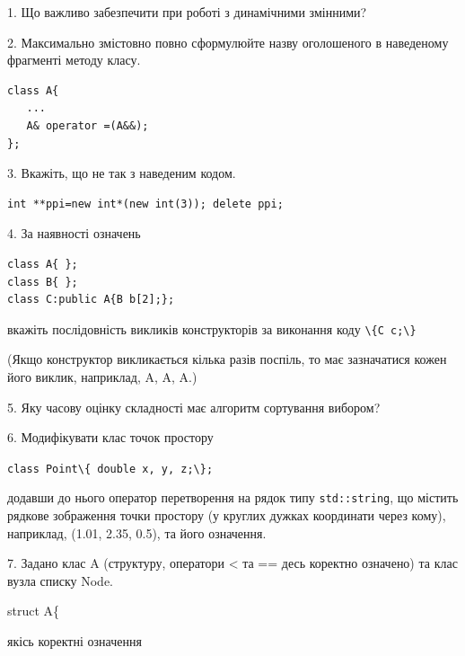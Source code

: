 \documentclass[12pt, ukrainian]{article}
\def\code#1{\Verb!#1!}
\begin{document}
{%
1. Що важливо забезпечити при роботі з динамічними змінними?%
\par
\vspace{2mm}
2. Максимально змістовно повно сформулюйте назву оголошеного в наведеному фрагменті методу класу.
\vspace{-3mm}
\begin{verbatim}class A{
   ...
   A& operator =(A&&);
};\end{verbatim}
\vspace{-3mm}
\par
\vspace{2mm}
3. Вкажіть, що не так з наведеним кодом.
\vspace{-3mm}
\begin{verbatim}int **ppi=new int*(new int(3)); delete ppi;\end{verbatim}
\vspace{-3mm}
\par
\vspace{2mm}
4. За наявності означень
\vspace{-3mm}
\begin{verbatim}
class A{ };
class B{ };
class C:public A{B b[2];};\end{verbatim}
\vspace{-3mm}
вкажіть послідовність викликів конструкторів за виконання коду \code{\{C c;\}} 

(Якщо конструктор викликається кілька разів поспіль, то має зазначатися кожен його виклик, наприклад, A, A, A.)

\vspace{2mm}
5. Яку часову оцінку складності має алгоритм сортування вибором?
\par
\vspace{2mm}
6. Модифікувати клас точок простору 

\qquad\code{class Point\{ double x, y, z;\};}


додавши до нього оператор перетворення на рядок типу \code{std::string}, що містить рядкове зображення точки простору (у круглих дужках координати через кому), наприклад, (1.01, 2.35, 0.5), та його означення.%
\par
\vspace{2mm}
7. 
Задано клас A (структуру, оператори < та == десь коректно означено) та клас вузла списку Node.

struct A\{

\quad  якісь коректні означення 

}
\end{document}
